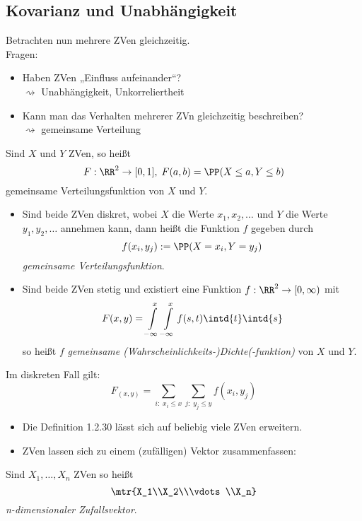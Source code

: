 \subsection{Kovarianz und Unabhängigkeit}

Betrachten nun mehrere ZVen gleichzeitig.\\
Fragen:
\begin{itemize}
\item Haben ZVen „Einfluss aufeinander“?\\
$\rightsquigarrow$ Unabhängigkeit, Unkorreliertheit
\item Kann man das Verhalten mehrerer ZVn gleichzeitig beschreiben?\\
$\rightsquigarrow$ gemeinsame Verteilung
\end{itemize}

 Sind $X$ und $Y$ ZVen, so heißt 
$$F: \RR^2 \to [0,1], \; F(a,b) = \PP(X \leq a, Y \leq b)$$
gemeinsame Verteilungsfunktion von $X$ und $Y$.
\begin{itemize}
\item Sind beide ZVen diskret, wobei $X$ die Werte $x_1, x_2, \dots$ und $Y$ die Werte $y_1, y_2, \dots$ annehmen kann, dann heißt die Funktion $f$ gegeben durch 
$$f(x_i, y_j):= \PP(X=x_i, Y=y_j)$$
\emph{gemeinsame Verteilungsfunktion}.
\item Sind beide ZVen stetig und existiert eine Funktion $f: \RR^2 \to [0,\infty)$ mit 
$$F(x,y) = \int\limits_{-\infty}^x\int\limits_{-\infty}^x f(s,t) \intd{t} \intd{s}$$
so heißt $f$ \emph{gemeinsame (Wahrscheinlichkeits-)Dichte(-funktion)} von $X$ und $Y$.
\end{itemize}

 Im diskreten Fall gilt:
$$F_(x,y) = \sum_{i:\; x_i\leq x} \sum_{j:\; y_j \leq y}f(x_i, y_j)$$
\begin{itemize}
\item Die Definition 1.2.30 lässt sich auf beliebig viele ZVen erweitern.
\item ZVen lassen sich zu einem (zufälligen) Vektor zusammenfassen:
\end{itemize}

 Sind $X_1, \dots, X_n$ ZVen so heißt
$$\mtr{X_1\\X_2\\\vdots\\X_n}$$
\emph{n-dimensionaler Zufallsvektor}.

